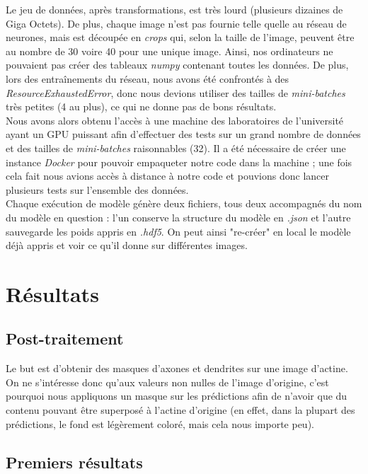 \documentclass{report}
\begin{document}
Le jeu de données, après transformations, est très lourd (plusieurs dizaines de Giga Octets).
De plus, chaque image n'est pas fournie telle quelle au réseau de neurones, mais
est découpée en \textit{crops} qui, selon la taille de l'image, peuvent être au nombre
de 30 voire 40 pour une unique image. Ainsi, nos ordinateurs ne pouvaient pas
créer des tableaux \textit{numpy} contenant toutes les données. De plus, lors des
entraînements du réseau, nous avons été confrontés à des \textit{ResourceExhaustedError},
donc nous devions utiliser des tailles de \textit{mini-batches} très petites (4 au plus),
ce qui ne donne pas de bons résultats. \\
Nous avons alors obtenu l'accès à une machine des laboratoires de l'université ayant
un GPU puissant afin d'effectuer des tests sur un grand nombre de données et des
tailles de \textit{mini-batches} raisonnables (32). Il a été nécessaire de créer
une instance \textit{Docker} pour pouvoir empaqueter notre code dans la machine ;
une fois cela fait nous avions accès à distance à notre code et pouvions donc
lancer plusieurs tests sur l'ensemble des données. \\
Chaque exécution de modèle génère deux fichiers, tous deux accompagnés du nom du
modèle en question : l'un conserve la structure du modèle en \textit{.json} et
l'autre sauvegarde les poids appris en \textit{.hdf5}. On peut ainsi "re-créer"
en local le modèle déjà appris et voir ce qu'il donne sur différentes images.


\chapter{Résultats}

\section{Post-traitement}

Le but est d'obtenir des masques d'axones et dendrites sur une image d'actine.
On ne s'intéresse donc qu'aux valeurs non nulles de l'image d'origine, c'est
pourquoi nous appliquons un masque sur les prédictions afin de n'avoir que du
contenu pouvant être superposé à l'actine d'origine (en effet, dans la plupart
des prédictions, le fond est légèrement coloré, mais cela nous importe peu).

\section{Premiers résultats}
\end{document}
